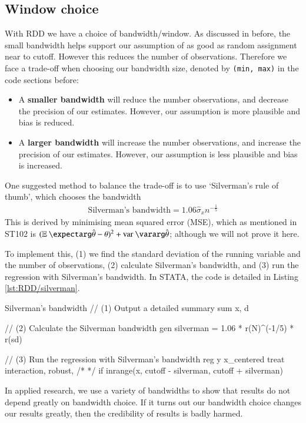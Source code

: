         \subsection{Window choice}
            With RDD we have a choice of bandwidth/window. As discussed in before, the small bandwidth helps support our assumption of as good as random assignment near to cutoff. However this reduces the number of observations. Therefore we face a trade-off when choosing our bandwidth size, denoted by \verb|(min, max)| in the code sections before:
            \begin{itemize}
                \item A \textbf{smaller bandwidth} will reduce the number observations, and decrease the precision of our estimates. However, our assumption is more plausible and bias is reduced.
                \item A \textbf{larger bandwidth} will increase the number observations, and increase the precision of our estimates. However, our assumption is less plausible and bias is increased.
            \end{itemize}
            One suggested method to balance the trade-off is to use `Silverman’s rule of thumb', which chooses the bandwidth
            \begin{align}
                \text{Silverman's bandwidth} = 1.06 \hat \sigma_x n^{-\frac{1}{5}}
            \end{align}
            This is derived by minimising mean squared error (MSE), which as mentioned in ST102 is $(\expect{\hat\theta} -\theta )^2 + \var{\hat\theta}$; although we will not prove it here.

            To implement this, (1) we find the standard deviation of the running variable and the number of observations, (2) calculate Silverman’s bandwidth, and (3) run the regression with Silverman’s bandwidth. In STATA, the code is detailed in Listing \ref{lst:RDD/silverman}.
            \begin{sexylisting}[colback=white, label=lst:RDD/silverman]{Silverman's bandwidth}
//  (1) Output a detailed summary
    sum x, d

//  (2) Calculate the Silverman bandwidth
    gen silverman = 1.06 * r(N)^(-1/5) * r(sd) 
    
//  (3) Run the regression with Silverman's bandwidth
    reg y x_centered treat interaction, robust, /*
    */ if inrange(x, cutoff - silverman, cutoff + silverman) 
            \end{sexylisting}
            In applied research, we use a variety of bandwidths to show that results do not depend greatly on bandwidth choice. If it turns out our bandwidth choice changes our results greatly, then the credibility of results is badly harmed.


